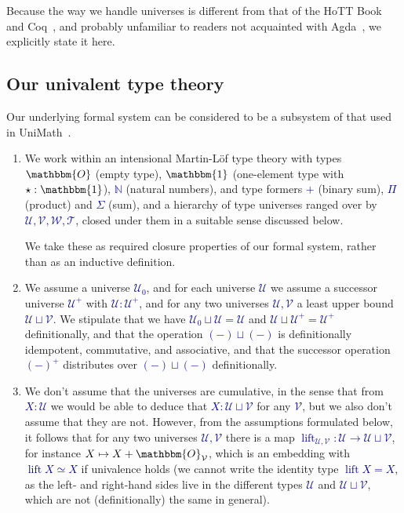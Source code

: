 \documentclass[10pt]{article}
\newcommand{\db}{\textcolor{darkblue}}
\newcommand{\m}[1]{\db{$#1$}}
\newcommand{\lift}{\operatorname{lift}}
\newcommand{\N}{\mathbb{N}}
\newcommand{\U}{\mathcal{U}}
\newcommand{\V}{\mathcal{V}}
\newcommand{\W}{\mathcal{W}}
\newcommand{\T}{\mathcal{T}}
\newcommand{\Zero}{\mathbbm{O}}
\newcommand{\One}{\mathbbm{1}}
\newcommand{\one}{\operatorname{\star}}
\theoremstyle{definition}
\begin{document}
Because the way we handle universes is different from that of the HoTT
Book~\cite{hottbook} and Coq~\cite{coq}, and probably unfamiliar to
readers not acquainted with Agda~\cite{agda}, we explicitly state it here.

\subsection{Our univalent type theory}

Our underlying formal system can be considered to be a subsystem of that
used in UniMath~\cite{unimath}.
\begin{enumerate}
\item We work within an intensional Martin-L\"of type theory with
  types \m{\Zero} (empty type), \m{\One} (one-element type with
  \m{\one:\One}), \m{\N} (natural numbers), and type formers \m{+}
  (binary sum), \m{\Pi} (product) and \m{\Sigma} (sum), and a
  hierarchy of type universes ranged over by \m{\U,\V,\W,\T}, closed
  under them in a suitable sense discussed below.

  We take these as required closure properties of our formal system,
  rather than as an inductive definition.

\item We assume a universe \m{\U_0}, and for each universe \m{\U} we
  assume a successor universe \m{\U^+} with \m{\U : \U^+}, and for any
  two universes \m{\U,\V} a least upper bound \m{\U \sqcup \V}. We
  stipulate that we have \m{\U_0 \sqcup \U = \U} and \m{\U \sqcup \U^+
    = \U^+} definitionally, and that the operation \m{(-)\sqcup(-)} is
  definitionally idempotent, commutative, and associative, and that
  the successor operation \m{(-)^+} distributes over \m{(-)\sqcup(-)}
  definitionally.

\item We don't assume that the universes are cumulative, in the sense
  that from \m{X : \U} we would be able to deduce that
  \m{X : \U \sqcup \V} for any \m{\V}, but we also don't assume that they
  are not. However, from the assumptions formulated below, it follows
  that for any two universes \m{\U,\V} there is a map
  \m{\lift_{\U,\V} : \U \to \U \sqcup \V}, for instance
  \m{X \mapsto X + \Zero_\V}, which is an embedding with
  \m{\lift X \simeq X} if univalence holds (we cannot write the identity
  type \m{\lift X = X}, as the left- and right-hand sides live in the different
  types \m{\U} and \m{\U \sqcup \V}, which are not (definitionally) the
  same in general).


\end{enumerate}
\end{document}
